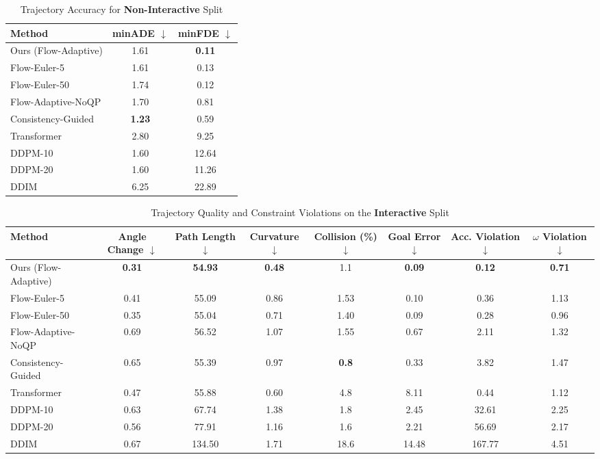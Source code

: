 \documentclass[conference]{IEEEtran}
\begin{document}
\begin{table}[t]
\centering
\caption{Trajectory Accuracy for \textbf{Non-Interactive} Split}
\label{tab:nonint_realism}
\begin{tabular}{lcc}
\toprule
\textbf{Method} & \textbf{minADE} $\downarrow$ & \textbf{minFDE} $\downarrow$ \\
\midrule
Ours (Flow-Adaptive) & 1.61 & \textbf{0.11} \\
Flow-Euler-5  & 1.61 & 0.13 \\
Flow-Euler-50 & 1.74 & 0.12 \\
Flow-Adaptive-NoQP & 1.70 & 0.81 \\
Consistency-Guided       & \textbf{1.23} & 0.59 \\
Transformer       & 2.80 & 9.25 \\
DDPM-10           & 1.60 & 12.64 \\
DDPM-20           & 1.60 & 11.26 \\
DDIM              & 6.25 & 22.89 \\
\bottomrule
\end{tabular}
\end{table}

\begin{table}[t]
\centering
\caption{Trajectory Quality and Constraint Violations on the \textbf{Interactive} Split}
\label{tab:quality_and_constraints_int}
\begin{adjustbox}{max width=\textwidth}
\begin{tabular}{lccccccc}
\toprule
\textbf{Method} & \textbf{Angle Change} $\downarrow$ & \textbf{Path Length} $\downarrow$ & \textbf{Curvature} $\downarrow$ & \textbf{Collision (\%)} $\downarrow$ & \textbf{Goal Error} $\downarrow$ & \textbf{Acc. Violation} $\downarrow$ & \textbf{$\omega$ Violation} $\downarrow$ \\
\midrule
Ours (Flow-Adaptive) & \textbf{0.31} & \textbf{54.93} & \textbf{0.48} & 1.1 & \textbf{0.09} & \textbf{0.12} & \textbf{0.71} \\
Flow-Euler-5  & 0.41 & 55.09 & 0.86 & 1.53 & 0.10 & 0.36 & 1.13 \\
Flow-Euler-50 & 0.35 & 55.04 & 0.71 & 1.40 & 0.09 & 0.28 & 0.96 \\
Flow-Adaptive-NoQP & 0.69 & 56.52 & 1.07 & 1.55 & 0.67 & 2.11 & 1.32  \\ 
Consistency-Guided       & 0.65 & 55.39 & 0.97 & \textbf{0.8}  & 0.33 & 3.82 & 1.47 \\
Transformer       & 0.47 & 55.88 & 0.60 & 4.8  & 8.11 & 0.44 & 1.12 \\
DDPM-10           & 0.63 & 67.74 & 1.38 & 1.8  & 2.45 & 32.61 & 2.25 \\
DDPM-20           & 0.56 & 77.91 & 1.16 & 1.6  & 2.21 & 56.69 & 2.17 \\
DDIM              & 0.67 & 134.50 & 1.71 & 18.6 & 14.48 & 167.77 & 4.51 \\
\bottomrule
\end{tabular}
\end{adjustbox}
\end{table}
\end{document}
